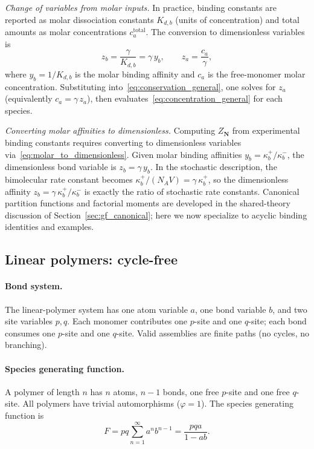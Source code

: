 \documentclass[11pt]{amsart}
\newcommand{\GFspecies}{F}
\newcommand{\GFensemble}{Z}
\theoremstyle{definition}
\theoremstyle{plain}
\theoremstyle{remark}
\begin{document}
\emph{Change of variables from molar inputs.}
In practice, binding constants are reported as molar dissociation constants $K_{d,b}$ (units of concentration) and total amounts as molar concentrations $c_a^{\mathrm{total}}$.
The conversion to dimensionless variables is
\begin{equation}\label{eq:molar_to_dimensionless}
z_b = \frac{\gamma}{K_{d,b}} = \gamma\,y_b,
\qquad
z_a = \frac{c_a}{\gamma},
\end{equation}
where $y_b = 1/K_{d,b}$ is the molar binding affinity and $c_a$ is the free-monomer molar concentration.
Substituting into~\eqref{eq:conservation_general}, one solves for $z_a$ (equivalently $c_a = \gamma\,z_a$), then evaluates~\eqref{eq:concentration_general} for each species.

\emph{Converting molar affinities to dimensionless.}
Computing $\GFensemble_{\mathbf{N}}$ from experimental binding constants requires converting to dimensionless variables via~\eqref{eq:molar_to_dimensionless}.
Given molar binding affinities $y_b = \kappa_b^+/\kappa_b^-$, the dimensionless bond variable is $z_b = \gamma\,y_b$.
In the stochastic description, the bimolecular rate constant becomes $\kappa_b^+/(N_A V) = \gamma\,\kappa_b^+$, so the dimensionless affinity $z_b = \gamma\,\kappa_b^+/\kappa_b^-$ is exactly the ratio of stochastic rate constants.
Canonical partition functions and factorial moments are developed in the shared-theory discussion of Section~\ref{sec:gf_canonical}; here we now specialize to acyclic binding identities and examples.

\subsection{Linear polymers: cycle-free}
\label{sec:cyclefree_linear}

\paragraph{Bond system.}
The linear-polymer system has one atom variable $a$, one bond variable $b$, and two site variables $p,q$.
Each monomer contributes one $p$-site and one $q$-site; each bond consumes one $p$-site and one $q$-site.
Valid assemblies are finite paths (no cycles, no branching).

\paragraph{Species generating function.}
A polymer of length $n$ has $n$ atoms, $n-1$ bonds, one free $p$-site and one free $q$-site.
All polymers have trivial automorphisms ($\varphi=1$).
The species generating function is
\[
\GFspecies = pq\sum_{n=1}^\infty a^n b^{n-1} = \frac{pqa}{1-ab}.
\]
\end{document}
